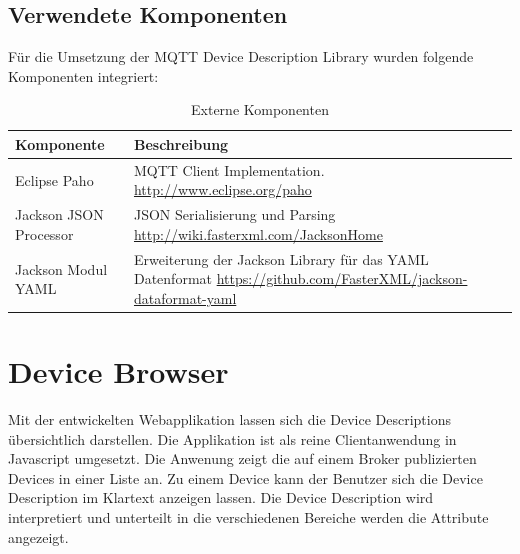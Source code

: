 \subsection{Verwendete Komponenten} {

Für die Umsetzung der MQTT Device Description Library wurden folgende Komponenten integriert:

\begin{table}[H]
\begin{tabularx}{\textwidth}{|l|X|}

 \hline \rowcolor{lightgray}
 {\bf Komponente } & {\bf Beschreibung }  \\  \hline
 
 Eclipse Paho & MQTT Client Implementation. \newline \url{http://www.eclipse.org/paho} \\ \hline

 Jackson JSON Processor & JSON Serialisierung und Parsing \newline \url{http://wiki.fasterxml.com/JacksonHome} \\ \hline
 
 Jackson Modul YAML & Erweiterung der Jackson Library für das YAML Datenformat \newline \url{https://github.com/FasterXML/jackson-dataformat-yaml} \\ \hline
 
\end{tabularx}
\caption{Externe Komponenten}
\end{table}


\section{Device Browser}
Mit der entwickelten Webapplikation lassen sich die Device Descriptions übersichtlich darstellen. Die Applikation ist als reine Clientanwendung in Javascript umgesetzt.
Die Anwenung zeigt die auf einem Broker publizierten Devices in einer Liste an. Zu einem Device kann der Benutzer sich die Device Description im Klartext anzeigen lassen. Die Device Description wird interpretiert und unterteilt in die verschiedenen Bereiche werden die Attribute angezeigt.

}

